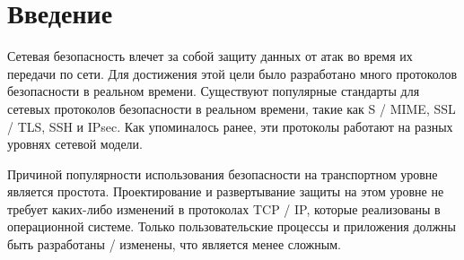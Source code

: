 \chapter*{Введение}\label{Input}

Сетевая безопасность влечет за собой защиту данных от атак во время их передачи по сети. Для достижения этой цели было разработано много протоколов безопасности в реальном времени. Существуют популярные стандарты для сетевых протоколов безопасности в реальном времени, такие как S / MIME, SSL / TLS, SSH и IPsec. Как упоминалось ранее, эти протоколы работают на разных уровнях сетевой модели.

Причиной популярности использования безопасности на транспортном уровне является простота. Проектирование и развертывание защиты на этом уровне не требует каких-либо изменений в протоколах TCP / IP, которые реализованы в операционной системе. Только пользовательские процессы и приложения должны быть разработаны / изменены, что является менее сложным.


